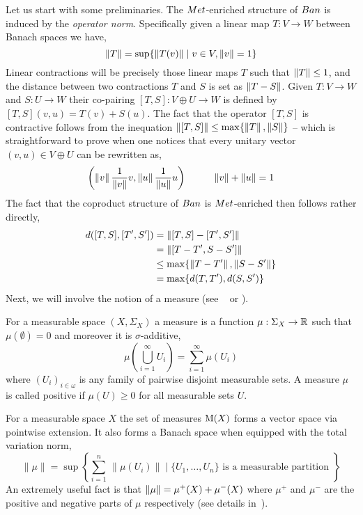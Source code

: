 \documentclass[a4paper,UKenglish,cleveref, autoref, thm-restate]{lipics-v2021}
\begin{document}
Let us start with some preliminaries. The $\Met$-enriched structure of $\Ban$
is induced by the \emph{operator norm}. Specifically given a linear map 
$T : V \to W$ between Banach spaces we have,
\[
        \left\lVert T \right\rVert = \sup \{ \left\lVert T(v) \right\rVert \mid v \in V, \left\lVert v \right\rVert = 1 \}
\]
Linear contractions will be precisely those linear maps $T$ such that $\left\lVert T \right\rVert
\leq 1$, and the distance between two contractions $T$ and $S$ is set as
$\left\lVert  T - S \right\rVert$. Given $T : V \to W$ and $S : U \to W$ their co-pairing $[T,S]
: V \oplus U \to W$ is defined by $[T,S](v,u) = T(v) + S(u)$. The fact that the
operator $[T,S]$ is contractive follows from the inequation $\left\lVert [T,S] \right\rVert \leq
\max \{ \left\lVert T \right\rVert, \left\lVert S \right\rVert \}$ -- which is straightforward to prove when
one notices that every unitary vector $(v,u) \in V \oplus U$ can be rewritten
as,
\[
        \left (\left\lVert v \right\rVert \frac{1}{\left\lVert v \right\rVert} v, \left\lVert u \right\rVert \frac{1}{\left\lVert u \right\rVert} u \right )
        \hspace{1cm}
        \left\lVert v \right\rVert + \left\lVert u \right\rVert = 1
\]
The fact that the coproduct structure of $\Ban$ is $\Met$-enriched then follows
rather directly,
\begin{align*}
        d([T,S] , [T',S']) 
        & = 
        \left\lVert  [T,S] - [T',S']  \right\rVert
        \\
        & = 
        \left\lVert  [T - T', S - S']  \right\rVert
        \\
        & \leq
        \max \{ \left\lVert T - T' \right\rVert, \left\lVert S - S' \right\rVert \}
        \\
        & =
        \max \{ d(T,T'), d(S,S') \}
\end{align*}
Next, we will involve the notion of a measure (see \eg\ \cite[Chapter
10]{aliprantis06} or \cite[Chapter 2]{panangaden09}).

\begin{definition} For a measurable space $(X,\Sigma_X)$ a measure is a
        function $\mu : \Sigma_X \to \mathbb{R}$ such that $\mu(\emptyset) = 0$ and
        moreover it is $\sigma$-additive, \ie\ 
        \[
        \mu \left (\bigcup_{i =1}^{\infty} U_i \right ) = \sum_{i = 1}^{\infty}
        \mu(U_i) 
        \] 
where $(U_i)_{i \in \omega}$ is any family of pairwise disjoint measurable
sets.  A measure $\mu$ is called positive if $\mu(U) \geq 0$ for all measurable
sets $U$.  
\end{definition}

For a measurable space $X$ the set of measures $\mathrm{M}(X)$ forms a vector space
via pointwise extension. It also forms a Banach space when equipped with the
total variation norm,
\[
        \lVert \mu \rVert = 
        \sup \left \{ \sum_{i = 1}^n \, \lVert \mu(U_i) \rVert \mid
             \{ U_1, \dots, U_n \} \text{ is a measurable partition }
        \right \}
\]
An extremely useful fact is that $\left\lVert \mu \right\rVert = \mu^{+}(X) + \mu^{-}(X)$ where
$\mu^{+}$ and $\mu^{-}$ are the positive and negative parts of $\mu$
respectively (see details in~\cite[Section 8.2. and Section
10.10]{aliprantis06}).
\end{document}

